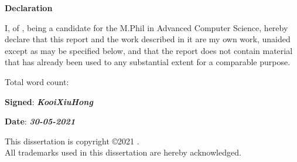 \newpage
{\Huge \bf Declaration}

\vspace{24pt} 

I, \authorname of \authorcollege, being a candidate for the M.Phil in
Advanced Computer Science, hereby declare that this report and the
work described in it are my own work, unaided except as may be
specified below, and that the report does not contain material that
has already been used to any substantial extent for a comparable
purpose.

\vspace{24pt}
Total word count: \wordcount

\vspace{60pt}
\textbf{Signed}: \textbf{\textit{KooiXiuHong}}

\vspace{12pt}
\textbf{Date}: \textbf{\textit{30-05-2021}}


\vfill

This dissertation is copyright \copyright 2021 \authorname. 
\\
All trademarks used in this dissertation are hereby acknowledged.



\newpage
\vspace*{\fill}
